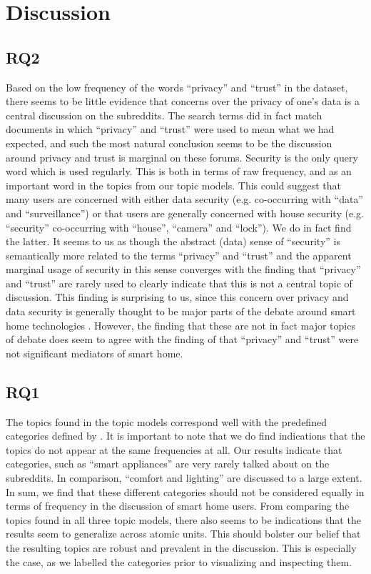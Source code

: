 \documentclass{article}
\begin{document}
    \section{Discussion}
    \subsection{RQ2}
    Based on the low frequency of the words “privacy” and “trust” in the dataset, there seems to be little evidence that concerns over the privacy of one's data is a central discussion on the subreddits. The search terms did in fact match documents in which “privacy” and “trust” were used to mean what we had expected, and such the most natural conclusion seems to be the discussion around privacy and trust is marginal on these forums. 
Security is the only query word which is used regularly. This is both in terms of raw frequency, and as an important word in the topics from our topic models. This could suggest that many users are concerned with either data security (e.g. co-occurring with “data” and “surveillance”) or that users are generally concerned with house security (e.g. “security” co-occurring with “house”, “camera” and “lock”). We do in fact find the latter. It seems to us as though the abstract (data) sense of “security” is semantically more related to the terms “privacy” and “trust” and the apparent marginal usage of security in this sense converges with the finding that “privacy” and “trust” are rarely used to clearly indicate that this is not a central topic of discussion. 
This finding is surprising to us, since this concern over privacy and data security is generally thought to be major parts of the debate around smart home technologies \cite{hubert2020take,tabassum2019investigating}. However, the finding that these are not in fact major topics of debate does seem to agree with the finding of \cite{hubert2020take} that “privacy” and “trust” were not significant mediators of smart home. 

    \subsection{RQ1}
    The topics found in the topic models correspond well with the predefined categories defined by . It is important to note that we do find indications that the topics do not appear at the same frequencies at all. Our results indicate that categories, such as “smart appliances” are very rarely talked about on the subreddits. In comparison, “comfort and lighting” are discussed to a large extent. In sum, we find that these different categories should not be considered equally in terms of frequency in the discussion of smart home users.
From comparing the topics found in all three topic models, there also seems to be indications that the results seem to generalize across atomic units. This should bolster our belief that the resulting topics are robust and prevalent in the discussion. This is especially the case, as we labelled the categories prior to visualizing and inspecting them. 
\end{document}
